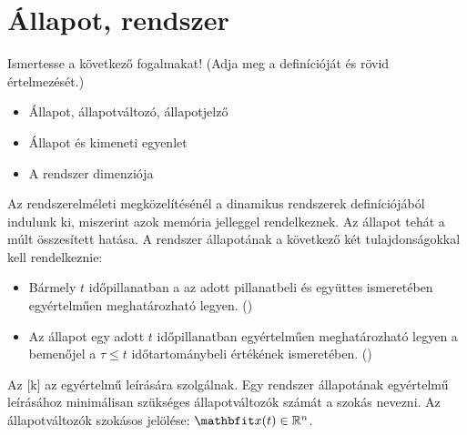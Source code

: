 \documentclass[../main.tex]{subfiles}
\begin{document}
\section{Állapot, rendszer}

\begin{fulltheorem}
  Ismertesse a következő fogalmakat!
  (Adja meg a definícióját és rövid értelmezését.)
  \begin{itemize}
    \item Állapot, állapotváltozó, állapotjelző
    \item Állapot és kimeneti egyenlet
    \item A rendszer dimenziója
  \end{itemize}
\end{fulltheorem}

Az  rendszerelméleti megközelítésénél a dinamikus rendszerek
definíciójából indulunk ki, miszerint azok memória jelleggel rendelkeznek.
Az állapot tehát a múlt összesített hatása. A rendszer állapotának a következő
két tulajdonságokkal kell rendelkeznie:
\begin{itemize}
  \item Bármely $t$ időpillanatban a  az adott pillanatbeli
         és  együttes ismeretében egyértelműen
        meghatározható legyen. ()
  \item Az állapot egy adott $t$ időpillanatban egyértelműen meghatározható
        legyen a bemenőjel a $\tau \leq t$ időtartománybeli értékének
        ismeretében. ()
\end{itemize}

Az [k] az  egyértelmű leírására szolgálnak.
Egy rendszer állapotának egyértelmű leírásához minimálisan szükséges
állapotváltozók számát a 
 szokás nevezni. Az állapotváltozók szokásos jelölése:
$\rvec x(t) \in \mathbb R^n$.
\end{document}
